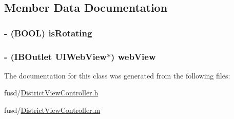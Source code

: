 \subsection{\-Member \-Data \-Documentation}
\hypertarget{interface_district_view_controller_ae5f099a2419cc6030a6300fd5148807b}{
\subsubsection[{is\-Rotating}]{\setlength{\rightskip}{0pt plus 5cm}-\/ (\-B\-O\-O\-L) {\bf is\-Rotating}}}
\label{interface_district_view_controller_ae5f099a2419cc6030a6300fd5148807b}
\hypertarget{interface_district_view_controller_ac799958f98447559b33d78743e0d4ad9}{
\subsubsection[{web\-View}]{\setlength{\rightskip}{0pt plus 5cm}-\/ (\-I\-B\-Outlet \-U\-I\-Web\-View$\ast$) {\bf web\-View}}}
\label{interface_district_view_controller_ac799958f98447559b33d78743e0d4ad9}


\-The documentation for this class was generated from the following files\-:\begin{DoxyCompactItemize}
\item 
fusd/\hyperlink{_district_view_controller_8h}{\-District\-View\-Controller.\-h}\item 
fusd/\hyperlink{_district_view_controller_8m}{\-District\-View\-Controller.\-m}\end{DoxyCompactItemize}
